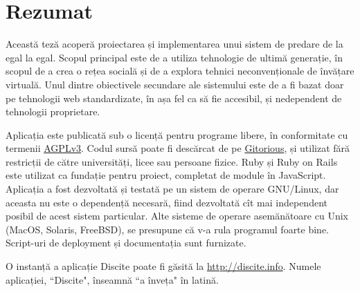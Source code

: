 \section*{Rezumat}
Această teză acoperă proiectarea și implementarea unui sistem de  predare de la egal la egal.
Scopul principal este de a utiliza tehnologie de ultimă generație, în scopul de a crea o
rețea socială și de a explora tehnici neconvenționale de învățare virtuală.
Unul dintre obiectivele secundare ale sistemului este de a fi bazat doar pe tehnologii web standardizate,
în așa fel ca să fie accesibil, și nedependent de tehnologii proprietare.

Aplicația este publicată sub o licență pentru programe libere, în conformitate cu termenii
\href{http://www.gnu.org/licenses/agpl-3.0.html}{AGPLv3}. Codul sursă poate fi
descărcat de pe \href {https://gitorious.org/discite/discite/}{Gitorious}, și
utilizat fără restricții de către universități, licee sau persoane fizice.
Ruby și Ruby on Rails este utilizat ca fundație pentru proiect, completat de module în JavaScript.
Aplicația a fost dezvoltată și testată pe un sistem de operare GNU/Linux, dar aceasta nu este o dependență necesară,
fiind dezvoltată cît mai independent posibil de acest sistem particular. Alte
sisteme de operare asemănătoare cu Unix (MacOS, Solaris, FreeBSD), se presupune
că v-a rula programul foarte bine. Script-uri de deployment
și documentația sunt furnizate.

O instanță a aplicație Discite poate fi găsită la \url{http://discite.info}.
Numele aplicației, ``Discite", înseamnă ``a înveța" în latină.

\clearpage

